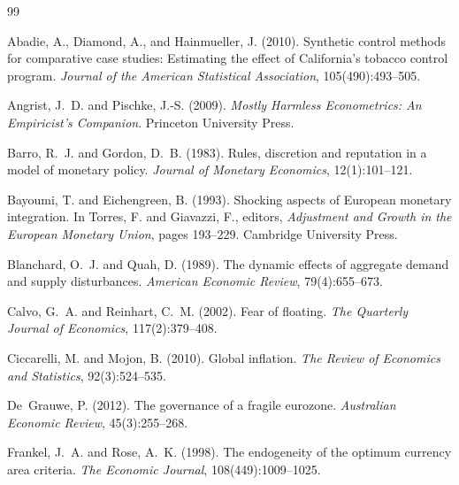 \documentclass[11pt,a4paper]{article}
\begin{document}
\begingroup
\renewcommand{\section}[2]{}  %
\begin{thebibliography}{99}
\small

Abadie, A., Diamond, A., and Hainmueller, J. (2010).
\newblock Synthetic control methods for comparative case studies: Estimating the
  effect of California's tobacco control program.
\newblock \emph{Journal of the American Statistical Association},
  105(490):493--505.

Angrist, J.~D. and Pischke, J.-S. (2009).
\newblock \emph{Mostly Harmless Econometrics: An Empiricist's Companion}.
\newblock Princeton University Press.

Barro, R.~J. and Gordon, D.~B. (1983).
\newblock Rules, discretion and reputation in a model of monetary policy.
\newblock \emph{Journal of Monetary Economics}, 12(1):101--121.

Bayoumi, T. and Eichengreen, B. (1993).
\newblock Shocking aspects of European monetary integration.
\newblock In Torres, F. and Giavazzi, F., editors, \emph{Adjustment and Growth
  in the European Monetary Union}, pages 193--229. Cambridge University Press.

Blanchard, O.~J. and Quah, D. (1989).
\newblock The dynamic effects of aggregate demand and supply disturbances.
\newblock \emph{American Economic Review}, 79(4):655--673.

Calvo, G.~A. and Reinhart, C.~M. (2002).
\newblock Fear of floating.
\newblock \emph{The Quarterly Journal of Economics}, 117(2):379--408.

Ciccarelli, M. and Mojon, B. (2010).
\newblock Global inflation.
\newblock \emph{The Review of Economics and Statistics}, 92(3):524--535.

De~Grauwe, P. (2012).
\newblock The governance of a fragile eurozone.
\newblock \emph{Australian Economic Review}, 45(3):255--268.

Frankel, J.~A. and Rose, A.~K. (1998).
\newblock The endogeneity of the optimum currency area criteria.
\newblock \emph{The Economic Journal}, 108(449):1009--1025.


\end{thebibliography}
\end{document}
